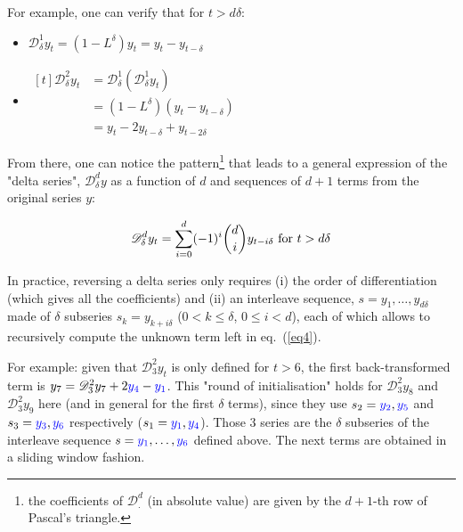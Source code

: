 \documentclass{article}
\begin{document}
For example, one can verify that for $t>d\delta$:
\begin{itemize}
  \item
  $
  \mathcal{D}_{\delta}^1y_t=(1-L^{\delta})y_t=y_t-y_{t-\delta}
  $ 
  \item
  $
  \begin{aligned}[t]
    \mathcal{D}_{\delta}^2y_t &= \mathcal{D}_{\delta}^1(\mathcal{D}_{\delta}^1y_t)\\
                  &= (1-L^{\delta})(y_t-y_{t-\delta})\\
                  &= y_t -2y_{t-\delta} + y_{t-2\delta}
  \end{aligned}
  $
\end{itemize}

From there, one can notice the pattern\footnote{the coefficients of $\mathcal{D}^d_{.}$ (in absolute value) are given by the $d+1$-th row of Pascal's triangle.} that leads to a general expression of the "delta series", $\mathcal{D}_{\delta}^dy$ as a function of $d$ and sequences of $d+1$ terms from the original series $y$: 

\begin{equation}
  \label{eq4}
  \mathcal{D}_{\delta}^dy_t = \sum_{i=0}^d (-1)^i \binom{d}{i} y_{t-i\delta} \textmd{ for } t>d\delta
\end{equation}

In practice, reversing a delta series only requires (i) the order of differentiation (which gives all the coefficients) and (ii) an interleave sequence, $s=y_1, \dots, y_{d\delta}$ made of $\delta$ subseries $s_k=y_{k+i\delta}$ ($0<k\leq \delta$, $0\leq i<d$), each of which allows to recursively compute the unknown term left in eq.~(\ref{eq4}).

For example: given that $\mathcal{D}_3^2 y_t$ is only defined for $t>6$, the first back-transformed term is $y_7 = \mathcal{D}_3^2y_7 + 2\textcolor{blue}{y_4} - \textcolor{blue}{y_1}$. This "round of initialisation" holds for $\mathcal{D}_3^2y_8$ and $\mathcal{D}_3^2y_9$ here (and in general for the first $\delta$ terms), since they use $s_2=\textcolor{blue}{y_2}, \textcolor{blue}{y_5}$ and $s_3=\textcolor{blue}{y_3}, \textcolor{blue}{y_6}$ respectively ($s_1=\textcolor{blue}{y_1}, \textcolor{blue}{y_4}$). Those 3 series are the $\delta$ subseries of the interleave sequence $s=\textcolor{blue}{y_1}, \dots, \textcolor{blue}{y_6}$ defined above. The next terms are obtained in a sliding window fashion.
\end{document}
